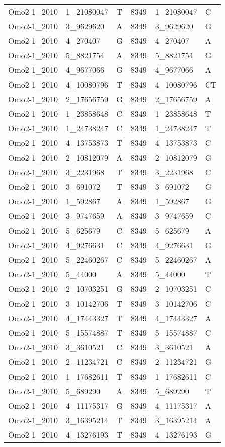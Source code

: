 \begin{center}
\begin{longtable}{|l|l|l|l|l|l|}
Omo2-1\_2010&1\_21080047&T&8349&1\_21080047&C\\
Omo2-1\_2010&3\_9629620&A&8349&3\_9629620&G\\
Omo2-1\_2010&4\_270407&G&8349&4\_270407&A\\
Omo2-1\_2010&5\_8821754&A&8349&5\_8821754&G\\
Omo2-1\_2010&4\_9677066&G&8349&4\_9677066&A\\
Omo2-1\_2010&4\_10080796&T&8349&4\_10080796&CT\\
Omo2-1\_2010&2\_17656759&G&8349&2\_17656759&A\\
Omo2-1\_2010&1\_23858648&C&8349&1\_23858648&T\\
Omo2-1\_2010&1\_24738247&C&8349&1\_24738247&T\\
Omo2-1\_2010&4\_13753873&T&8349&4\_13753873&C\\
Omo2-1\_2010&2\_10812079&A&8349&2\_10812079&G\\
Omo2-1\_2010&3\_2231968&T&8349&3\_2231968&C\\
Omo2-1\_2010&3\_691072&T&8349&3\_691072&G\\
Omo2-1\_2010&1\_592867&A&8349&1\_592867&G\\
Omo2-1\_2010&3\_9747659&A&8349&3\_9747659&C\\
Omo2-1\_2010&5\_625679&C&8349&5\_625679&A\\
Omo2-1\_2010&4\_9276631&C&8349&4\_9276631&G\\
Omo2-1\_2010&5\_22460267&C&8349&5\_22460267&A\\
Omo2-1\_2010&5\_44000&A&8349&5\_44000&T\\
Omo2-1\_2010&2\_10703251&G&8349&2\_10703251&C\\
Omo2-1\_2010&3\_10142706&T&8349&3\_10142706&C\\
Omo2-1\_2010&4\_17443327&T&8349&4\_17443327&A\\
Omo2-1\_2010&5\_15574887&T&8349&5\_15574887&C\\
Omo2-1\_2010&3\_3610521&C&8349&3\_3610521&A\\
Omo2-1\_2010&2\_11234721&C&8349&2\_11234721&G\\
Omo2-1\_2010&1\_17682611&T&8349&1\_17682611&C\\
Omo2-1\_2010&5\_689290&A&8349&5\_689290&T\\
Omo2-1\_2010&4\_11175317&G&8349&4\_11175317&A\\
Omo2-1\_2010&3\_16395214&T&8349&3\_16395214&A\\
Omo2-1\_2010&4\_13276193&T&8349&4\_13276193&G\\

\end{longtable}
\end{center}

